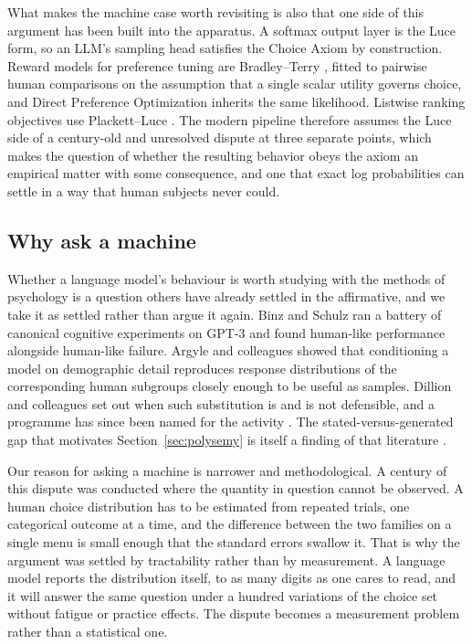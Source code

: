 \documentclass[11pt]{article}
\begin{document}
What makes the machine case worth revisiting is also that one side of this
argument has been built into the apparatus. A softmax output layer is the
Luce form, so an LLM's sampling head satisfies the Choice Axiom by
construction. Reward models for preference tuning are Bradley--Terry
\cite{bradley1952}, fitted to pairwise human comparisons on the assumption
that a single scalar utility governs choice, and Direct Preference
Optimization \cite{rafailov2023} inherits the same likelihood. Listwise
ranking objectives use Plackett--Luce \cite{plackett1975}. The modern
pipeline therefore assumes the Luce side of a century-old and unresolved
dispute at three separate points, which makes the question of whether the
resulting behavior obeys the axiom an empirical matter with some
consequence, and one that exact log probabilities can settle in a way that
human subjects never could.

\subsection{Why ask a machine}
\label{sec:machinepsych}

Whether a language model's behaviour is worth studying with the methods of
psychology is a question others have already settled in the affirmative, and we
take it as settled rather than argue it again. Binz and Schulz \cite{binz2023}
ran a battery of canonical cognitive experiments on GPT-3 and found human-like
performance alongside human-like failure. Argyle and colleagues
\cite{argyle2023} showed that conditioning a model on demographic detail
reproduces response distributions of the corresponding human subgroups closely
enough to be useful as samples. Dillion and colleagues \cite{dillion2023} set
out when such substitution is and is not defensible, and a programme has since
been named for the activity \cite{hagendorff2023}. The stated-versus-generated
gap that motivates Section~\ref{sec:polysemy} is itself a finding of that
literature \cite{cekinmez2026}.

Our reason for asking a machine is narrower and methodological. A century of
this dispute was conducted where the quantity in question cannot be observed.
A human choice distribution has to be estimated from repeated trials, one
categorical outcome at a time, and the difference between the two families on a
single menu is small enough that the standard errors swallow it. That is why
the argument was settled by tractability rather than by measurement. A language
model reports the distribution itself, to as many digits as one cares to read,
and it will answer the same question under a hundred variations of the choice
set without fatigue or practice effects. The dispute becomes a measurement
problem rather than a statistical one.
\end{document}
